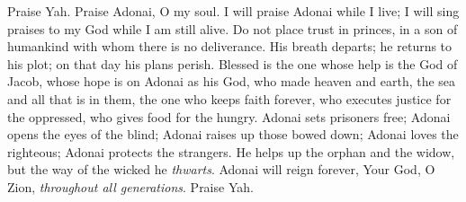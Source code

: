 \begin{biblechapter} %
 Praise Yah. 
Praise Adonai, O my soul.
\verse I will praise Adonai while I live; 
I will sing praises to my God while I am still alive.
\verse Do not place trust in princes, 
in a son of humankind with whom there is no deliverance.
\verse His breath departs; he returns to his plot; 
on that day his plans perish.
\verse Blessed is the one whose help is the God of Jacob, 
whose hope is on Adonai as his God,
\verse who made heaven and earth, 
the sea and all that is in them, 
the one who keeps faith forever,
\verse who executes justice for the oppressed, 
who gives food for the hungry. 
Adonai sets prisoners free;
\verse Adonai opens the eyes of the blind; 
Adonai raises up those bowed down; 
Adonai loves the righteous;
\verse Adonai protects the strangers. 
He helps up the orphan and the widow, 
but the way of the wicked he \textit{thwarts}.
\verse Adonai will reign forever, 
Your God, O Zion, \textit{throughout all generations}. 
Praise Yah.
\end{biblechapter}

